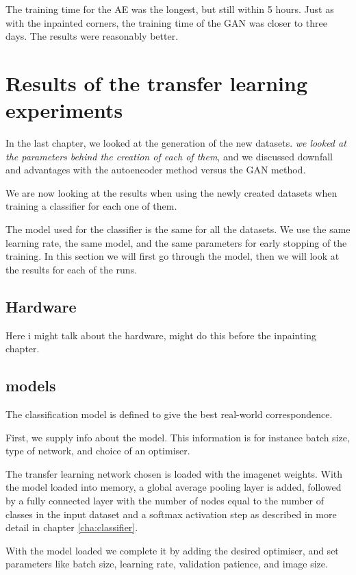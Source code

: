 \vspace{5px}
\noindent The training time for the AE was the longest, but still within 5 hours.
Just as with the inpainted corners, the training time of the GAN was closer to three days. The results were reasonably better. 


   
\FloatBarrier
\section{Results of the transfer learning experiments}
In the last chapter, we looked at the generation of the new datasets. \textit{we looked at the parameters behind the creation of each of them}, and we discussed downfall and advantages with the autoencoder method versus the GAN method. 

We are now looking at the results when using the newly created datasets when training a classifier for each one of them. 


The model used for the classifier is the same for all the datasets. We use the same learning rate, the same model, and the same parameters for early stopping of the training.  In this section we will first go through the model, then we will look at the results for each of the runs.
\subsection{Hardware}
Here i might talk about the hardware, might do this before the inpainting chapter.


\subsection{models}
The classification model is defined to give the best real-world correspondence.

First, we supply info about the model. This information is for instance batch size, type of network, and choice of an optimiser. 

The transfer learning network chosen is loaded with the imagenet weights. With the model loaded into memory, a global average pooling layer is added, followed by a fully connected layer with the number of nodes equal to the number of classes in the input dataset and a softmax activation step as described in more detail in chapter \ref{cha:classifier}. 

With the model loaded we complete it by adding the desired optimiser, and set parameters like batch size, learning rate, validation patience, and image size.

